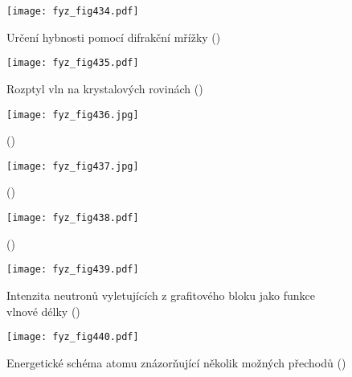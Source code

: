 {  \begin{figure}[ht!] %
    \centering
    \texttt{[image: fyz\_fig434.pdf]}
    \caption{Určení hybnosti pomocí difrakční mřížky
             (\cite[s.~513]{Feynman01})}
    \label{fyz:fig434}
  \end{figure}

  \begin{figure}[ht!] %
    \centering
    \texttt{[image: fyz\_fig435.pdf]}
    \caption{Rozptyl vln na krystalových rovinách
             (\cite[s.~514]{Feynman01})}
    \label{fyz:fig435}
  \end{figure}

  \begin{figure}[ht!] %
    \centering
    \texttt{[image: fyz\_fig436.jpg]}
    \caption{
             (\cite[s.~515]{Feynman01})}
    \label{fyz:fig436}
  \end{figure}

  \begin{figure}[ht!] %
    \centering
    \texttt{[image: fyz\_fig437.jpg]}
    \caption{
             (\cite[s.~515]{Feynman01})}
    \label{fyz:fig437}
  \end{figure}

  \begin{figure}[ht!] %
    \centering
    \texttt{[image: fyz\_fig438.pdf]}
    \caption{
             (\cite[s.~515]{Feynman01})}
    \label{fyz:fig438}
  \end{figure}

  \begin{figure}[ht!] %
    \centering
    \texttt{[image: fyz\_fig439.pdf]}
    \caption{Intenzita neutronů vyletujících z grafitového bloku jako funkce vlnové délky
             (\cite[s.~516]{Feynman01})}
    \label{fyz:fig439}
  \end{figure}

  \begin{figure}[ht!] %
    \centering
    \texttt{[image: fyz\_fig440.pdf]}
    \caption{Energetické schéma atomu znázorňující několik možných přechodů
             (\cite[s.~518]{Feynman01})}
    \label{fyz:fig440}
  \end{figure}
  
} %
\printbibliography[title={Seznam literatury}, heading=subbibliography]
